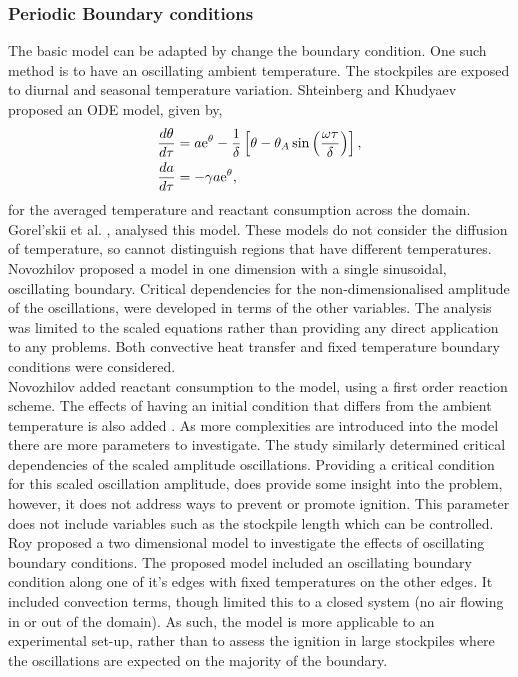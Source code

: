\subsubsection{Periodic Boundary conditions}
The basic model can be adapted by change the boundary condition. One such method is to have an oscillating ambient temperature. The stockpiles are exposed to diurnal and seasonal temperature variation. Shteinberg and Khudyaev \cite{shtein05} proposed an ODE model, given by,
\begin{align}
\frac{d\theta}{d\tau}&=a\mathrm{e}^\theta-\frac{1}{\delta}\left[\theta-\theta_A\sin\left(\frac{\omega\tau}{\delta}\right)\right],\\
\frac{da}{d\tau}&=-\gamma a\mathrm{e}^\theta,
\end{align}
for the averaged temperature and reactant consumption across the domain. Gorel'skii et al. \cite{gorel10}, analysed this model. These models do not consider the diffusion of temperature, so cannot distinguish regions that have different temperatures. \\
Novozhilov \cite{novozhilov16} proposed a model in one dimension with a single sinusoidal, oscillating boundary. Critical dependencies for the non-dimensionalised amplitude of the oscillations, were developed in terms of the other variables. The analysis was limited to the scaled equations rather than providing any direct application to any problems. Both convective heat transfer and fixed temperature boundary conditions were considered.\\
Novozhilov \cite{novozhilov18} added reactant consumption to the model, using a first order reaction scheme. The effects of having an initial condition that differs from the ambient temperature is also added \cite{novozhilov18}. As more complexities are introduced into the model there are more parameters to investigate. The study similarly determined critical dependencies of the scaled amplitude oscillations. Providing a critical condition for this scaled oscillation amplitude, does provide some insight into the problem, however, it does not address ways to prevent or promote ignition. This parameter does not include variables such as the stockpile length which can be controlled.\\ 
Roy \cite{roy18} proposed a two dimensional model to investigate the effects of oscillating boundary conditions. The proposed model included an oscillating boundary condition along one of it's edges with fixed temperatures on the other edges. It included convection terms, though limited this to a closed system (no air flowing in or out of the domain). As such, the model is more applicable to an experimental set-up, rather than to assess the ignition in large stockpiles where the oscillations are expected on the majority of the boundary.\\ 
